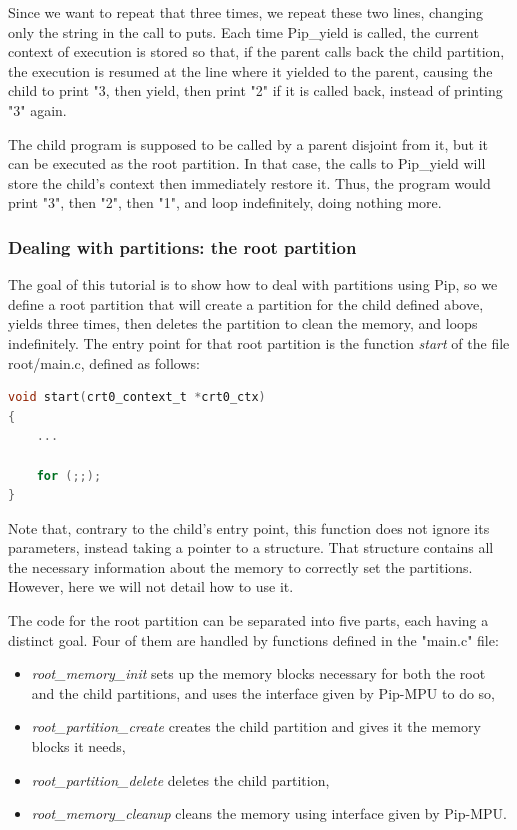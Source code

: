 \documentclass[10pt,a4paper,titlepage]{refart}
\begin{document}
Since we want to repeat that three times, we repeat these two lines, changing only the string in the call to puts. Each time Pip\_yield is 
called, the current context of execution is stored so that, if the parent calls back the child partition, the execution is resumed at the 
line where it yielded to the parent, causing the child to print "3, then yield, then print "2" if it is called back, instead of printing "3" 
again.


The child program is supposed to be called by a parent disjoint from it, but it can be executed as the root partition. In that case, the 
calls to Pip\_yield will store the child's context then immediately restore it. Thus, the program would print "3", then "2", then "1", and 
loop indefinitely, doing nothing more. %

\subsubsection{Dealing with partitions: the root partition}

The goal of this tutorial is to show how to deal with partitions using Pip, so we define a root partition that will create a partition for 
the child defined above, yields three times, then deletes the partition to clean the memory, and loops indefinitely. The entry point for 
that root partition is the function \textit{start} of the file root/main{.}c, defined as follows:
\begin{lstlisting}[language=C]
void start(crt0_context_t *crt0_ctx)
{
    ...

    for (;;);
}
\end{lstlisting}
Note that, contrary to the child's entry point, this function does not ignore its parameters, instead taking a pointer to a structure. That 
structure contains all the necessary information about the memory to correctly set the partitions. However, here we will not detail how to 
use it.

The code for the root partition can be separated into five parts, each having a distinct goal. Four of them are handled by functions 
defined in the "main{.}c" file:
\begin{itemize}
    \item \textit{root\_memory\_init} sets up the memory blocks necessary for both the root and the child partitions, and uses the 
    interface given by Pip-MPU to do so,
    \item \textit{root\_partition\_create} creates the child partition and gives it the memory blocks it needs,
    \item \textit{root\_partition\_delete} deletes the child partition,
    \item \textit{root\_memory\_cleanup} cleans the memory using interface given by Pip-MPU.
\end{itemize}
\end{document}
